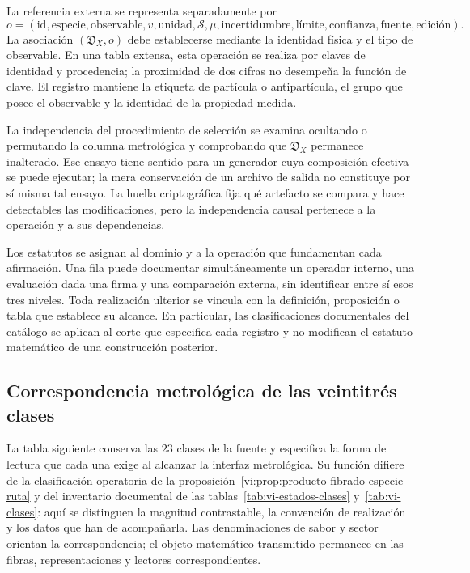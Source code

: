 La referencia externa se representa separadamente por
\[
 o=(\mathrm{id},\mathrm{especie},\mathrm{observable},
      v,\mathrm{unidad},\mathscr S,\mu,
      \mathrm{incertidumbre},\mathrm{límite},\mathrm{confianza},
      \mathrm{fuente},\mathrm{edición}).
\]
La asociación \((\mathfrak D_X,o)\) debe establecerse mediante la
identidad física y el tipo de observable. En una tabla extensa, esta
operación se realiza por claves de identidad y procedencia; la proximidad
de dos cifras no desempeña la función de clave. El registro mantiene la
etiqueta de partícula o antipartícula, el grupo que posee el observable y
la identidad de la propiedad medida.

La independencia del procedimiento de selección se examina ocultando o
permutando la columna metrológica y comprobando que \(\mathfrak D_X\)
permanece inalterado. Ese ensayo tiene sentido para un generador cuya
composición efectiva se puede ejecutar; la mera conservación de un archivo
de salida no constituye por sí misma tal ensayo. La huella criptográfica
fija qué artefacto se compara y hace detectables las modificaciones, pero
la independencia causal pertenece a la operación y a sus dependencias.

Los estatutos se asignan al dominio y a la operación que fundamentan cada
afirmación. Una fila puede documentar simultáneamente un operador interno,
una evaluación dada una firma y una comparación externa, sin identificar
entre sí esos tres niveles. Toda realización ulterior se vincula con la
definición, proposición o tabla que establece su alcance. En particular, las
clasificaciones documentales del catálogo se aplican al corte que especifica
cada registro y no modifican el estatuto matemático de una construcción
posterior.

\subsection{Correspondencia metrológica de las veintitrés clases}
\label{subsec:vi-clases-metrologia}

La tabla siguiente conserva las \(23\) clases de la fuente y especifica la
forma de lectura que cada una exige al alcanzar la interfaz metrológica. Su
función difiere de la clasificación operatoria de la
proposición~\ref{vi:prop:producto-fibrado-especie-ruta} y del inventario
documental de las tablas~\ref{tab:vi-estados-clases} y~\ref{tab:vi-clases}:
aquí se distinguen la magnitud contrastable, la convención de realización y
los datos que han de acompañarla. Las denominaciones de sabor y sector
orientan la correspondencia; el objeto matemático transmitido permanece en
las fibras, representaciones y lectores correspondientes.

